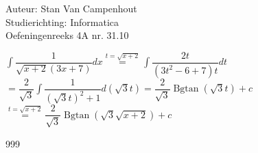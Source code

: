 \documentclass[a4paper]{article}
\begin{document}
  
\noindent \large Auteur: Stan Van Campenhout \\
\noindent \large Studierichting:  Informatica\\
\noindent \large Oefeningenreeks 4A nr. 31.10\\

\medskip

\normalsize

$ \displaystyle\int \dfrac{1}{\sqrt{x+2}\left(3x+7\right)} dx \stackrel{t = \sqrt{x+2}}{=} \displaystyle\int\dfrac{2t}{\left(3t^2-6+7\right)t}dt $\\

$ = \dfrac{2}{\sqrt{3}}\displaystyle\int\dfrac{1}{\left(\sqrt{3}t\right)^2+1}d\left(\sqrt{3}t\right) = \dfrac{2}{\sqrt{3}}\operatorname{Bgtan}\left(\sqrt{3}t\right) + c $\\

$ \stackrel{t = \sqrt{x+2}}{=} \dfrac{2}{\sqrt{3}}\operatorname{Bgtan}\left(\sqrt{3}\sqrt{x+2}\right) + c $\\

\begin{thebibliography}{999}
\end{thebibliography}
\end{document}
